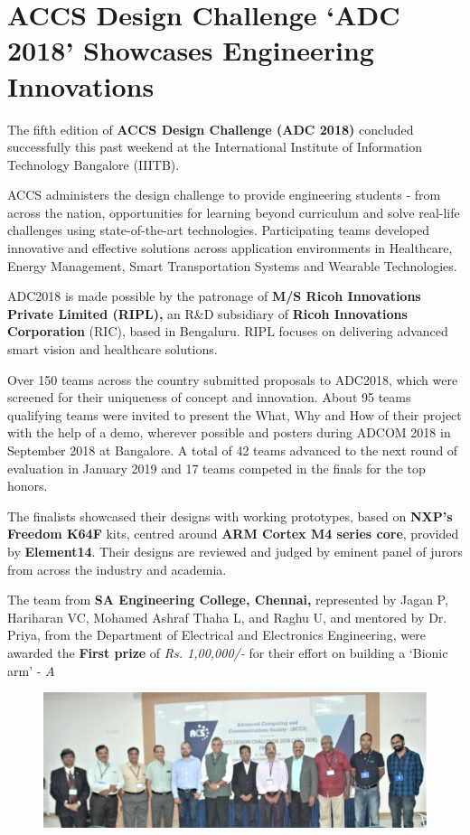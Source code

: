 \chapter{ACCS Design Challenge ‘ADC 2018’ Showcases Engineering Innovations}

\begin{multicols}{2}

The fifth edition of \textbf{ACCS Design Challenge (ADC 2018)} concluded successfully this past weekend at the International Institute of Information Technology Bangalore (IIITB). 

ACCS administers the design challenge to provide engineering students - from across the nation, opportunities for learning beyond curriculum and solve real-life challenges using state-of-the-art technologies. Participating teams developed innovative and effective solutions across application environments in Healthcare, Energy Management, Smart Transportation Systems and Wearable Technologies.  

ADC2018 is made possible by the patronage of \textbf{M/S Ricoh Innovations Private Limited (RIPL),} an R\&D subsidiary of \textbf{Ricoh Innovations Corporation} (RIC), based in Bengaluru. RIPL focuses on delivering advanced smart vision and healthcare solutions. 

Over 150 teams across the country submitted proposals to ADC2018, which were screened for their uniqueness of concept and innovation. About 95 teams qualifying teams were invited to present the What, Why and How of their project with the help of a demo, wherever possible and posters during ADCOM 2018 in September 2018 at Bangalore. A total of 42 teams advanced to the next round of evaluation in January 2019 and 17 teams competed in the finals for the top honors. 

The finalists showcased their designs with working prototypes, based on \textbf{NXP's Freedom K64F} kits, centred around \textbf{ARM Cortex M4 series core}, provided by \textbf{Element14}. Their designs are reviewed and judged by eminent panel of jurors from across the industry and academia. 

The team from \textbf{SA Engineering College, Chennai,} represented by Jagan P, Hariharan VC, Mohamed Ashraf Thaha L, and Raghu U, and mentored by Dr. Priya, from the Department of Electrical and Electronics Engineering, were awarded the \textbf{First prize} of \textit{Rs. 1,00,000/-} for their effort on building a `Bionic arm’ - $A$ 

\end{multicols}

\begin{figure}[H]
\centering
\includegraphics[scale=3.28]{src/Figures/adc.jpg}
\end{figure}



